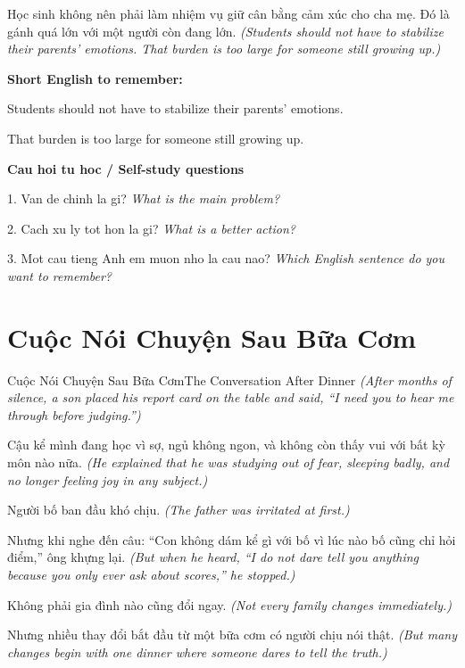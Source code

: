 \begin{baihoc}
Học sinh không nên phải làm nhiệm vụ giữ cân bằng cảm xúc cho cha mẹ. Đó là gánh quá lớn với một người còn đang lớn.
\textit{(Students should not have to stabilize their parents’ emotions. That burden is too large for someone still growing up.)}
\end{baihoc}

\begin{ghinhoanh}
\textbf{Short English to remember:}

Students should not have to stabilize their parents’ emotions.

That burden is too large for someone still growing up.

\end{ghinhoanh}

\begin{tuhocnhanh}
\textbf{Cau hoi tu hoc / Self-study questions}

1. Van de chinh la gi? \textit{What is the main problem?}

2. Cach xu ly tot hon la gi? \textit{What is a better action?}

3. Mot cau tieng Anh em muon nho la cau nao? \textit{Which English sentence do you want to remember?}
\end{tuhocnhanh}
\ngancach

\section{Cuộc Nói Chuyện Sau Bữa Cơm}
\begin{truyen}{Cuộc Nói Chuyện Sau Bữa Cơm}{The Conversation After Dinner}
\textit{(After months of silence, a son placed his report card on the table and said, ``I need you to hear me through before judging.'')}

Cậu kể mình đang học vì sợ, ngủ không ngon, và không còn thấy vui với bất kỳ môn nào nữa.
\textit{(He explained that he was studying out of fear, sleeping badly, and no longer feeling joy in any subject.)}

Người bố ban đầu khó chịu.
\textit{(The father was irritated at first.)}

Nhưng khi nghe đến câu: ``Con không dám kể gì với bố vì lúc nào bố cũng chỉ hỏi điểm,'' ông khựng lại.
\textit{(But when he heard, ``I do not dare tell you anything because you only ever ask about scores,'' he stopped.)}

Không phải gia đình nào cũng đổi ngay.
\textit{(Not every family changes immediately.)}

Nhưng nhiều thay đổi bắt đầu từ một bữa cơm có người chịu nói thật.
\textit{(But many changes begin with one dinner where someone dares to tell the truth.)}

\end{truyen}

